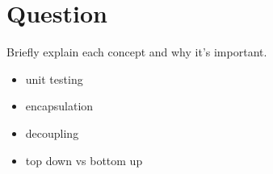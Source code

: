 




\docCopyright

\section{Question}

Briefly explain each concept and why it's important.
\textQuestion{\makeDashedLine}
\begin{itemize}
  \item unit testing
    \vfill\textQuestion{\makeDashedLine}
  \item encapsulation
    \vfill\textQuestion{\makeDashedLine}
  \item decoupling
    \vfill\textQuestion{\makeDashedLine}
  \item top down vs bottom up
    \vfill
\end{itemize}



